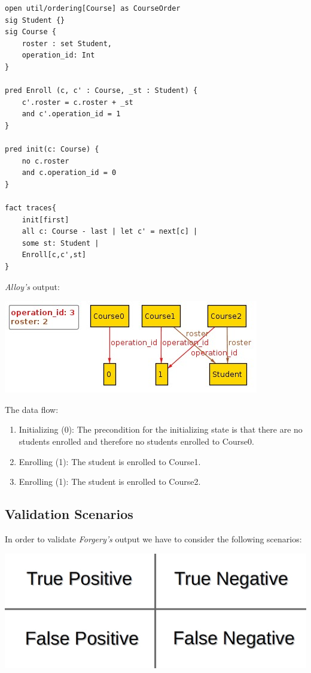 \documentclass[oneside]{book}
\begin{document}
\begin{lstlisting}
open util/ordering[Course] as CourseOrder
sig Student {}
sig Course {
	roster : set Student,
	operation_id: Int
}

pred Enroll (c, c' : Course, _st : Student) {
	c'.roster = c.roster + _st
	and c'.operation_id = 1 
}

pred init(c: Course) {
	no c.roster
	and c.operation_id = 0
}

fact traces{
    init[first]
    all c: Course - last | let c' = next[c] | 
	some st: Student |
	Enroll[c,c',st]
}
\end{lstlisting}
\newpage
\textit{Alloy's} output:\\
\begin{center}
\includegraphics[scale=0.7]{output_traces}
\end{center}

The data flow:
\begin{enumerate}
	\item Initializing (0): The precondition for the initializing state is that there are no students enrolled and therefore no students enrolled to Course0.
	\item Enrolling (1): The student is enrolled to Course1.
	\item Enrolling (1): The student is enrolled to Course2.
\end{enumerate}

\subsection{Validation Scenarios}

In order to validate \textit{Forgery's} output we have to consider the following scenarios:
\begin{center}
\includegraphics[scale=0.25]{scenarios}
\end{center}
\end{document}
